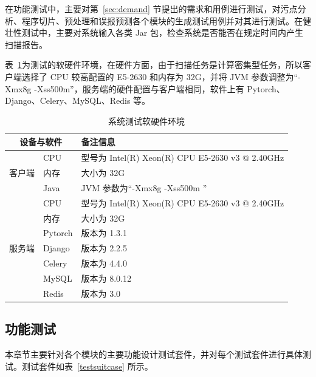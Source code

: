 在功能测试中，主要对第~\ref{sec:demand} 节提出的需求和用例进行测试，对污点分析、程序切片、预处理和误报预测各个模块的生成测试用例并对其进行测试。在健壮性测试中，主要对系统输入各类 Jar 包，检查系统是否能否在规定时间内产生扫描报告。

表~\ref{tab:testenv}为测试的软硬件环境，在硬件方面，由于扫描任务是计算密集型任务，所以客户端选择了 CPU 较高配置的 E5-2630 和内存为 32G，并将 JVM 参数调整为“-Xmx8g -Xss500m”，服务端的硬件配置与客户端相同，软件上有 Pytorch、Django、Celery、MySQL、Redis 等。

\begin{table}[!htbp]\footnotesize
    \centering
    \caption{系统测试软硬件环境}
    \begin{tabular}{cll}
        \toprule
        \multicolumn{2}{c}{设备与软件} & 备注信息 \\
        \midrule
        \multirow{3}[2]{*}{客户端} & CPU   & 型号为 Intel(R) Xeon(R) CPU E5-2630 v3 @ 2.40GHz \\
        & 内存    & 大小为 32G \\
        & Java  & JVM 参数为“-Xmx8g -Xss500m ”\\
        \midrule
        \multirow{7}[2]{*}{服务端} 
        & CPU   & 型号为 Intel(R) Xeon(R) CPU E5-2630 v3 @ 2.40GHz \\
        & 内存    & 大小为 32G \\
        & Pytorch & 版本为 1.3.1 \\
        & Django & 版本为 2.2.5 \\
        & Celery & 版本为 4.4.0 \\
        & MySQL & 版本为 8.0.12 \\
        & Redis & 版本为 3.0 \\
        \bottomrule
    \end{tabular}%
    \label{tab:testenv}%
\end{table}%

\subsection{功能测试}
本章节主要针对各个模块的主要功能设计测试套件，并对每个测试套件进行具体测试。测试套件如表~\ref{testsuitcase} 所示。

